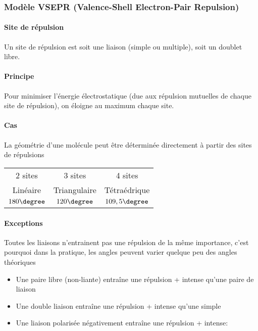 \subsubsection{Modèle VSEPR (Valence-Shell Electron-Pair Repulsion)}
\paragraph{Site de répulsion}
Un site de répulsion est soit une liaison (simple ou multiple), soit un doublet libre.

\paragraph{Principe}
Pour minimiser l'énergie électrostatique (due aux répulsion mutuelles de chaque site de répulsion), on éloigne au maximum chaque site.

\paragraph{Cas}
La géométrie d'une molécule peut être déterminée directement à partir des sites de répulsions
\begin{center}
	\begin{tabular}{ccc}
		2 sites & 3 sites & 4 sites\\
		Linéaire & Triangulaire & Tétraédrique\\
		$180\degree$ & $120\degree$ & $109,5\degree$\\
	\end{tabular}
\end{center}

\paragraph{Exceptions}
Toutes les liaisons n'entrainent pas une répulsion de la même importance, c'est pourquoi dans la pratique, les angles peuvent varier quelque peu des angles théoriques
\begin{itemize}
	\item Une paire libre (non-liante) entraîne une répulsion + intense qu'une paire de liaison
	\item Une double liaison entraîne une répulsion + intense qu'une simple
	\item Une liaison polarisée négativement entraîne une répulsion + intense:
		\begin{center}
		\end{center}
\end{itemize}

